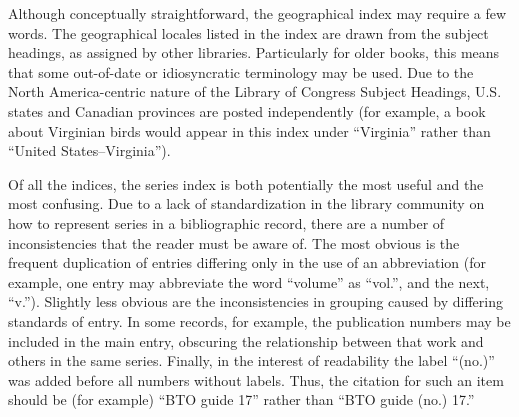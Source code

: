 Although conceptually straightforward, the geographical index may require a few
words. The geographical locales listed in the index are drawn from the subject
headings, as assigned by other libraries. Particularly for older books, this
means that some out-of-date or idiosyncratic terminology may be used. Due to the
North America-centric nature of the Library of Congress Subject Headings, U.S.
states and Canadian provinces are posted independently (for example, a book about
Virginian birds would appear in this index under ``Virginia'' rather than ``United
States--Virginia'').

Of all the indices, the series index is both potentially the most useful and
the most confusing. Due to a lack of standardization in the library community
on how to represent series in a bibliographic record, there are a number of
inconsistencies that the reader must be aware of. The most obvious is the
frequent duplication of entries differing only in the use of an abbreviation
(for example, one entry may abbreviate the word ``volume'' as ``vol.'', and the
next, ``v.''). Slightly less obvious are the inconsistencies in grouping caused
by differing standards of entry. In some records, for example, the publication
numbers may be included in the main entry, obscuring the relationship between that
work and others in the same series. Finally, in the interest of readability the
label ``(no.)'' was added before all numbers without labels. Thus, the citation
for such an item should be (for example) ``BTO guide 17'' rather than ``BTO guide
(no.) 17.''
